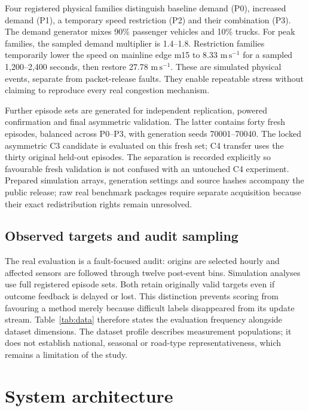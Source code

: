 \documentclass[pdflatex,sn-mathphys-num]{sn-jnl}
\newcommand{\ms}{\mathrm{m\,s^{-1}}}
\begin{document}
Four registered physical families distinguish baseline demand (P0), increased demand (P1), a temporary speed restriction (P2) and their combination (P3). The demand generator mixes 90\% passenger vehicles and 10\% trucks. For peak families, the sampled demand multiplier is 1.4--1.8. Restriction families temporarily lower the speed on mainline edge m15 to 8.33 $\ms$ for a sampled 1,200--2,400 seconds, then restore 27.78 $\ms$. These are simulated physical events, separate from packet-release faults. They enable repeatable stress without claiming to reproduce every real congestion mechanism.

Further episode sets are generated for independent replication, powered confirmation and final asymmetric validation. The latter contains forty fresh episodes, balanced across P0--P3, with generation seeds 70001--70040. The locked asymmetric C3 candidate is evaluated on this fresh set; C4 transfer uses the thirty original held-out episodes. The separation is recorded explicitly so favourable fresh validation is not confused with an untouched C4 experiment. Prepared simulation arrays, generation settings and source hashes accompany the public release; raw real benchmark packages require separate acquisition because their exact redistribution rights remain unresolved.

\subsection{Observed targets and audit sampling}
The real evaluation is a fault-focused audit: origins are selected hourly and affected sensors are followed through twelve post-event bins. Simulation analyses use full registered episode sets. Both retain originally valid targets even if outcome feedback is delayed or lost. This distinction prevents scoring from favouring a method merely because difficult labels disappeared from its update stream. Table~\ref{tab:data} therefore states the evaluation frequency alongside dataset dimensions. The dataset profile describes measurement populations; it does not establish national, seasonal or road-type representativeness, which remains a limitation of the study.

\section{System architecture}\label{sec:architecture}
\end{document}
